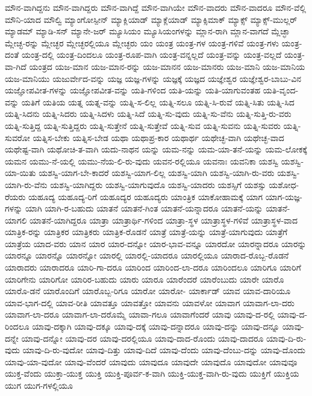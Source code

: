{ಮೌನ-ವಾಗಿದ್ದನು
ಮೌನ-ವಾಗಿದ್ದರು
ಮೌನ-ವಾಗಿದ್ದೆ
ಮೌನ-ವಾಗಿಯೇ
ಮೌನ-ವಾದರು
ಮೌನ-ವಾದರೂ
ಮೌನ-ವೆಲ್ಲಿ
ಮೌನಿ-ಯಾದ
ಮೌಲ್ವಿ
ಮ್ಯಾಂಗೋಸ್ಪೀನ್
ಮ್ಯಾಕ್ಲಿಯಾಡ್
ಮ್ಯಾಕ್ಲೆಯಾಡ್
ಮ್ಯಾಕ್ಸಿಮಾಕ್
ಮ್ಯಾಕ್ಸ್
ಮ್ಯಾಕ್ಸ್-ಮುಲ್ಲರ್
ಮ್ಯಾಡಮ್
ಮ್ಯಾಡಿ-ಸನ್
ಮ್ಯಾನೇ-ಜರ್
ಮ್ಯೂಸಿಯಂ
ಮ್ಯೂಸಿಯಂಗಳನ್ನು
ಮ್ಲಾನ-ರಾಗಿ
ಮ್ಲಾನ-ವಾಗದೆ
ಮ್ಲೆಚ್ಛಾ
ಮ್ಲೇಚ್ಛ-ರನ್ನು
ಮ್ಲೇಚ್ಛರ
ಮ್ಲೇಚ್ಛರಲ್ಲಿಯೂ
ಮ್ಲೇಚ್ಛರು
ಯಂ
ಯಂತ್ರ
ಯಂತ್ರ-ಗಳ
ಯಂತ್ರ-ಗಳಿವೆ
ಯಂತ್ರ-ಗಳು
ಯಂತ್ರ-ದಂತೆ
ಯಂತ್ರ-ದಲ್ಲಿ
ಯಂತ್ರ-ದಿಂದಲೂ
ಯಂತ್ರ-ರೂಪ-ವಾಗಿ
ಯಂತ್ರ-ವನ್ನಲ್ಲದೆ
ಯಂತ್ರ-ವನ್ನು
ಯಂತ್ರ-ವಲ್ಲದೆ
ಯಂತ್ರ-ವಾ-ಗಿದೆ
ಯಂತ್ರದ
ಯಜ-ಮಾನ
ಯಜ-ಮಾನ-ರನ್ನು
ಯಜ-ಮಾನನ
ಯಜ-ಮಾನರು
ಯಜ-ಮಾನಿ
ಯಜ-ಮಾನಿಯ
ಯಜ-ಮಾನಿಯು
ಯಜುರ್ವೇದ-ವನ್ನು
ಯಜ್ಞ
ಯಜ್ಞ-ಗಳನ್ನು
ಯಜ್ಞಕ್ಕೆ
ಯಜ್ಞದ
ಯಜ್ಞೇಶ್ವರ
ಯಜ್ಞೇಶ್ವರ-ಬಾಬು-ವಿನ
ಯಜ್ಞೋಪವೀತ-ಗಳನ್ನು
ಯಜ್ಞೋಪವೀತ-ವನ್ನು
ಯತಿ-ಗಳಿಂದ
ಯತಿ-ಯನ್ನು
ಯತಿ-ಯಾಗುವಂತಹ
ಯತಿ-ವೃಂದ-ವನ್ನು
ಯತಿಗೆ
ಯತಿಯ
ಯತ್ನ
ಯತ್ನ-ವನ್ನು
ಯತ್ನಿ-ಸ-ಲಿಲ್ಲ
ಯತ್ನಿ-ಸಲೂ
ಯತ್ನಿ-ಸಿ-ರುವೆ
ಯತ್ನಿ-ಸಿತು
ಯತ್ನಿ-ಸಿದ
ಯತ್ನಿ-ಸಿದನು
ಯತ್ನಿ-ಸಿದರು
ಯತ್ನಿ-ಸಿದಳು
ಯತ್ನಿ-ಸಿದೆ
ಯತ್ನಿ-ಸು-ವುದು
ಯತ್ನಿ-ಸು-ವೆನು
ಯತ್ನಿ-ಸುತ್ತಿ-ರು-ವರು
ಯತ್ನಿ-ಸುತ್ತಿದ್ದ
ಯತ್ನಿ-ಸುತ್ತಿದ್ದರು
ಯತ್ನಿ-ಸುತ್ತೇನೆ
ಯತ್ನಿ-ಸುತ್ತೇವೆ
ಯತ್ನಿ-ಸುವ
ಯತ್ನಿ-ಸುವನು
ಯತ್ನಿ-ಸುವರು
ಯತ್ನಿ-ಸುವರೋ
ಯತ್ನಿಸ-ಬೇಕು
ಯತ್ನಿಸ-ಬೇಡ
ಯಥಾ
ಯಥಾಪ್ರ-ಕಾರ
ಯಥಾರ್ಥ
ಯಥೇಚ್ಛ-ವಾಗಿ
ಯಥೇಚ್ಛ-ವಾದ
ಯಥೇಷ್ಟ-ವಾಗಿ
ಯಥೋಚಿ-ತ-ವಾಗಿ
ಯದು-ನಾಥನ
ಯನ್ನು
ಯಮ-ನನ್ನು
ಯಮ-ಯಾ-ತನೆ-ಯನ್ನು
ಯಮ-ಲೋಕಕ್ಕೆ
ಯಮನ
ಯಮು-ನೆ-ಯಲ್ಲಿ
ಯಮು-ನೆಯ-ಲಿ-ರು-ವುದು
ಯವನ-ರಲ್ಲಿಯೂ
ಯವನಾಃ
ಯವನಿಕಾ
ಯಶಸ್ವಿ
ಯಶಸ್ವಿ-ಯಾ-ಯಿತು
ಯಶಸ್ವಿ-ಯಾಗ-ಬೇ-ಕಾದರೆ
ಯಶಸ್ವಿ-ಯಾಗ-ಲಿಲ್ಲ
ಯಶಸ್ವಿ-ಯಾಗಿ
ಯಶಸ್ವಿ-ಯಾಗಿ-ರು-ವರು
ಯಶಸ್ವಿ-ಯಾಗಿ-ರು-ವೆನು
ಯಶಸ್ವಿ-ಯಾಗಿದ್ದರು
ಯಶಸ್ವಿ-ಯಾಗುವುದೊ
ಯಶಸ್ವಿ-ಯಾದರು
ಯಶಸ್ಸಿಗೆ
ಯಶಸ್ಸು
ಯಶೋಧ-ರೆಯರು
ಯಹೂದ್ಯ
ಯಹೂದ್ಯ-ರಿಗೆ
ಯಹೂದ್ಯರ
ಯಹೂದ್ಯರು
ಯಾಂತ್ರಿಕ
ಯಾಕೋಹಾಮಕ್ಕೆ
ಯಾಗ
ಯಾಗ-ಯಜ್ಞ-ಗಳನ್ನು
ಯಾಗಿ
ಯಾಗಿ-ರ-ಬಹುದು
ಯಾತನೆ
ಯಾತನೆ-ಗಿಂತ
ಯಾತನೆ-ಯನ್ನಾದರೂ
ಯಾತನೆ-ಯನ್ನು
ಯಾತನೆ-ಯಾಗಲಿ
ಯಾತನೆ-ಯಾಗಿದ್ದರೂ
ಯಾತ್ರಾ
ಯಾತ್ರಾರ್ಥಿ-ಗಳಿಂದ
ಯಾತ್ರಾ-ಸ್ಥಳ
ಯಾತ್ರಾಸ್ಥಳ-ಗಳಿವೆ
ಯಾತ್ರಾಸ್ಥಳ-ವಾದ
ಯಾತ್ರಿಕ-ರನ್ನು
ಯಾತ್ರಿಕರ
ಯಾತ್ರಿಕರು
ಯಾತ್ರಿಕ-ರೊಡನೆ
ಯಾತ್ರೆ
ಯಾತ್ರೆ-ಯನ್ನು
ಯಾತ್ರೆ-ಯಾಗುವುದು
ಯಾತ್ರೆಗೆ
ಯಾತ್ರೆಯ
ಯಾದ-ವರು
ಯಾನ
ಯಾರ
ಯಾರ-ದನ್ನೋ
ಯಾರ-ಭಾವ-ವನ್ನೂ
ಯಾರದೋ
ಯಾರನ್ನಾದರೂ
ಯಾರನ್ನು
ಯಾರನ್ನೂ
ಯಾರನ್ನೊ
ಯಾರನ್ನೋ
ಯಾರಲ್ಲಿ
ಯಾರಲ್ಲಿ-ಯಾದರೂ
ಯಾರಲ್ಲಿಯೂ
ಯಾರಾದ-ರೊಬ್ಬ-ರೊಡನೆ
ಯಾರಾದರು
ಯಾರಾದರೂ
ಯಾರಿ-ಗಾ-ದರೂ
ಯಾರಿಂದ
ಯಾರಿಂದ-ಲಾ-ದರೂ
ಯಾರಿಂದಲೂ
ಯಾರಿಗೂ
ಯಾರಿಗೆ
ಯಾರಿಗೇನು
ಯಾರಿಗೋ
ಯಾರಿರ-ಬಹುದು
ಯಾರು
ಯಾರೂ
ಯಾರೆಂದರೆ
ಯಾರೆಂಬುದು
ಯಾರೇ
ಯಾರೊ
ಯಾರೊ-ಡನೆ
ಯಾರೊಂದಿಗೆ
ಯಾರೊಬ್ಬ-ರಿಗೂ
ಯಾರೋ
ಯಾರೋ-
ಯಾರ್ಕಾಡ್
ಯಾವ
ಯಾವ-ದಾರಿಯೂ
ಯಾವ-ಭಾಗ-ದಲ್ಲಿ
ಯಾವ-ರೀತಿ
ಯಾವತ್ತೂ
ಯಾವತ್ತೋ
ಯಾವನು
ಯಾವಳೋ
ಯಾವಾಗ
ಯಾವಾಗ-ಲಾ-ದರು
ಯಾವಾಗ-ಲಾ-ದರೂ
ಯಾವಾಗ-ಲಾ-ದರೊಮ್ಮೆ
ಯಾವಾ-ಗಲೂ
ಯಾವಾಗೆಂದರೆ
ಯಾವು
ಯಾವು-ದ-ರಲ್ಲಿ
ಯಾವು-ದ-ರಿಂದಲೂ
ಯಾವು-ದಕ್ಕಾಗಿ
ಯಾವು-ದಕ್ಕೂ
ಯಾವು-ದಕ್ಕೆ
ಯಾವು-ದನ್ನಾದರೂ
ಯಾವು-ದನ್ನು
ಯಾವು-ದನ್ನೂ
ಯಾವು-ದನ್ನೇ
ಯಾವು-ದನ್ನೋ
ಯಾವು-ದರ
ಯಾವು-ದರಲ್ಲಿಯೂ
ಯಾವು-ದಾದ-ರೊಂದು
ಯಾವು-ದಾದರೂ
ಯಾವು-ದಿ-ರು-ವುದು
ಯಾವು-ದಿ-ರು-ವುದೋ
ಯಾವು-ದಿತ್ತು
ಯಾವು-ದಿದೆ
ಯಾವು-ದೆಂದು
ಯಾವು-ದೆಂಬು-ದನ್ನು
ಯಾವು-ದೊಂದು
ಯಾವು-ಯಾ-ವುದೋ
ಯಾವು-ವೆಂದರೆ
ಯಾವುದು
ಯಾವುದೂ
ಯಾವುದೇ
ಯಾವುದೊ
ಯಾವುದೋ
ಯಾವುವೂ
ಯುಕ್ತ-ವೆಂದು
ಯುಕ್ತಾ-ಯುಕ್ತ
ಯುಕ್ತಿ
ಯುಕ್ತಿ-ಪೂರ್ವ-ಕ-ವಾಗಿ
ಯುಕ್ತಿ-ಯುಕ್ತ-ವಾಗಿ-ರು-ವುದು
ಯುಕ್ತಿಗೆ
ಯುಕ್ತಿಯ
ಯುಗ
ಯುಗ-ಗಳಲ್ಲಿಯೂ
}
